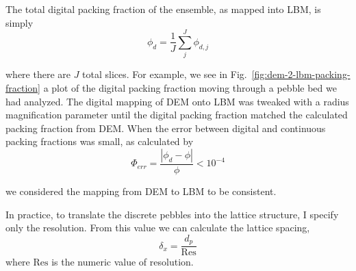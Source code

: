 The total digital packing fraction of the ensemble, as mapped into LBM, is simply
\begin{equation}
	\phi_d = \frac{1}{J}\sum_j^J\phi_{d,j}
\end{equation}

where there are $J$ total slices. For example, we see in Fig.~\ref{fig:dem-2-lbm-packing-fraction} a plot of the digital packing fraction moving through a pebble bed we had analyzed. The digital mapping of DEM onto LBM was tweaked with a radius magnification parameter until the digital packing fraction matched the calculated packing fraction from DEM. When the error between digital and continuous packing fractions was small, as calculated by
\begin{equation}
	\Phi_{err} = \frac{|\phi_d - \phi|}{\phi} < 10^{-4}
\end{equation}

we considered the mapping from DEM to LBM to be consistent.

In practice, to translate the discrete pebbles into the lattice structure, I specify only the resolution. From this value we can calculate the lattice spacing,
\begin{equation}
	\delta_x = \frac{d_p}{\text{Res}}
\end{equation}
where $\text{Res}$ is the numeric value of resolution.
\FloatBarrier